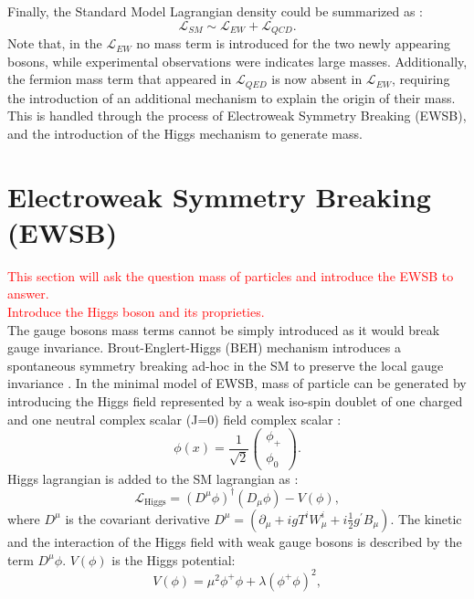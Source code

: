 Finally, the Standard Model Lagrangian density could be summarized as : 
\begin{equation}
    \mathcal{L}_{SM} \sim \mathcal{L}_{EW} + \mathcal{L}_{QCD}.
\end{equation}
Note that, in the $\mathcal{L}_{EW}$ no mass term is introduced for the two newly appearing bosons, while experimental observations were indicates large masses. Additionally, the fermion mass term that appeared in $\mathcal{L}_{QED}$ is now absent in $\mathcal{L}_{EW}$, requiring the introduction of an additional mechanism to explain the origin of their mass. This is handled through the process of Electroweak Symmetry Breaking (EWSB), and the introduction of the Higgs mechanism to generate mass.

\section{Electroweak Symmetry Breaking (EWSB)}
\label{chap1:EWSB}
\textcolor{red}{This section will ask the question mass of particles and introduce the EWSB to answer.\\
Introduce the Higgs boson and its proprieties.\\
}
The gauge bosons mass terms cannot be simply introduced as it would break gauge invariance. Brout-Englert-Higgs (BEH) mechanism introduces a spontaneous symmetry breaking ad-hoc in the SM to preserve the local gauge invariance \cite{Englert}. In the minimal model of EWSB, mass of particle can be generated by introducing the Higgs field represented by a weak iso-spin doublet of one charged and one neutral complex scalar (J=0) field complex scalar :
\begin{equation}
    \phi(x)=\frac{1}{\sqrt{2}}\left(\begin{array}{c}
\phi_{+} \\
\phi_{0}
\end{array}\right).
\end{equation}
Higgs lagrangian is added to the SM lagrangian as :
\begin{equation}
    \mathcal{L}_{\mathrm{Higgs}}=\left(D^{\mu} \phi\right)^{\dagger}\left(D_{\mu} \phi\right)-V(\phi),
\end{equation}
where $D^\mu$ is the covariant derivative $D^\mu =\left(\partial_{\mu}+i g T^{i} W_{\mu}^{i}+i \frac{1}{2} g^{\prime} B_{\mu}\right)$. The kinetic and the interaction of the Higgs field with weak gauge bosons is described by the term $D^\mu\phi$. $V(\phi)$ is the Higgs potential:
\begin{equation}
    V(\phi)=\mu^{2} \phi^{+} \phi+\lambda\left(\phi^{+} \phi\right)^{2},
\end{equation}

